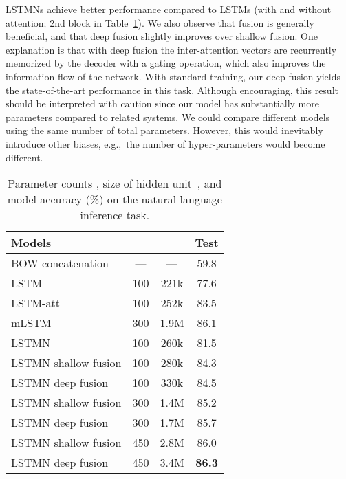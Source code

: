 \documentclass[11pt,letterpaper]{article}
\begin{document}
        LSTMNs achieve better performance compared to LSTMs (with and
        without attention; 2nd block in Table~\ref{entailment}).  We
        also observe that fusion is generally beneficial, and that
        deep fusion slightly improves over shallow fusion. One
        explanation is that with deep fusion the inter-attention
        vectors are recurrently memorized by the decoder with a gating
        operation, which also improves the information flow of the
        network. With standard training, our deep fusion yields the
        state-of-the-art performance in this task. Although
        encouraging, this result should be interpreted with caution
        since our model has substantially more parameters compared to
        related systems. We could compare different models using the
        same number of total parameters. However, this would
        inevitably introduce other biases, e.g.,~the number of
        hyper-parameters would become different.



	\begin{table}[t]
		\centering
\begin{tabular}{|@{~}l c  c  c@{~}|}
			\hline
			Models &  &  & Test \\\hline
			\hline
			 BOW concatenation & --- &   ---  & 59.8 \\
			\hline
			LSTM {\scriptsize  \cite{bowman2015large}}  & 100 &  221k  & 77.6 \\
			LSTM-att {\scriptsize \cite{rocktaschel2015reasoning}} & 100 & 252k &  83.5 \\
			 mLSTM {\scriptsize \cite{wang2015learning}} & 300 & 1.9M &  {86.1} \\     
			\hline
			LSTMN & 100 & 260k  & 81.5 \\
			LSTMN shallow fusion & 100 & 280k  &  84.3\\
			LSTMN deep fusion & 100 & 330k  &  84.5 \\
			LSTMN shallow fusion & 300 & 1.4M  &  85.2 \\
			LSTMN deep fusion & 300 & 1.7M &  85.7 \\
			LSTMN shallow fusion & 450 & 2.8M   &  86.0\\
			LSTMN deep fusion & 450 & 3.4M & \textbf{86.3} \\
			\hline
		\end{tabular}
		\caption{Parameter counts , size
                  of hidden unit~, and  model accuracy (\%) 
                  on the natural language inference task.} 
		\label{entailment}
		\vspace{-2.5ex}
	\end{table}
	
\end{document}
